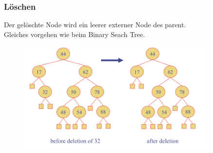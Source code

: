 \documentclass[a4paper,10pt]{report}
\begin{document}
\subsubsection{Löschen}
Der gelöschte Node wird ein leerer externer Node des parent.\\
Gleiches vorgehen wie beim Binary Seach Tree.
\begin{figure}[H]
	\begin{center}
  		\includegraphics[width=0.9\textwidth]{img/avltreedeletion.png}
	\end{center}
\end{figure}
\newpage
\end{document}
